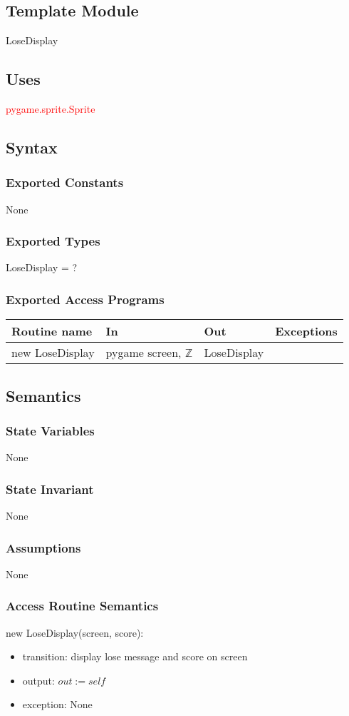 \documentclass[12pt]{article}
\begin{document}
\subsection*{Template Module}
LoseDisplay

\subsection*{Uses}
\textcolor{red}{pygame.sprite.Sprite}

\subsection*{Syntax}
\subsubsection*{Exported Constants}
None
\subsubsection*{Exported Types}
LoseDisplay = ?
\subsubsection*{Exported Access Programs}

\begin{tabular}{| l | l | l | p{5cm} |}
\hline
\textbf{Routine name} & \textbf{In} & \textbf{Out} & \textbf{Exceptions}\\
\hline
new LoseDisplay & pygame screen, $\mathbb{Z}$ &LoseDisplay& \\
\hline
\end{tabular}

\subsection*{Semantics}
\subsubsection*{State Variables}
None
\subsubsection*{State Invariant}
None
\subsubsection*{Assumptions}
None
\subsubsection*{Access Routine Semantics}
\noindent new LoseDisplay(screen, score):
\begin{itemize}
\item transition: display lose message and score on screen
\item output: $out := \mathit{self}$
\item exception: None
\end{itemize}
\newpage
\end{document}
